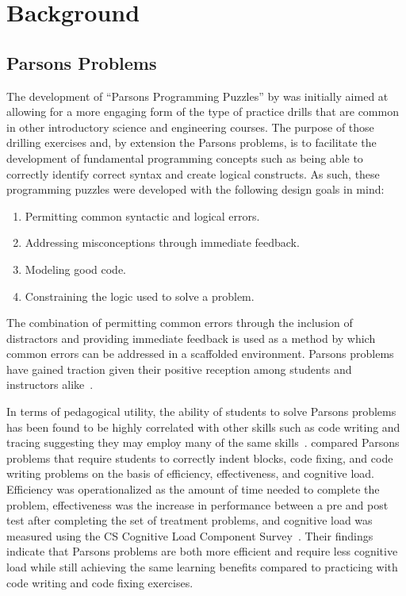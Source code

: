 \documentclass[authorversion,nonacm]{acmart}
\begin{document}
\section{Background}

\subsection{Parsons Problems}

The development of ``Parsons Programming Puzzles'' by \citet{parsons2006parson}
was initially aimed at allowing for a more engaging form of the type of
practice drills that are common in other introductory science and engineering
courses. The purpose of those drilling exercises and, by extension the Parsons
problems, is to facilitate the development of fundamental programming concepts
such as being able to correctly identify correct syntax and create logical
constructs.  As such, these programming puzzles were developed with the
following design goals in mind:
\begin{enumerate}
    \item Permitting common syntactic and logical errors.
    \item Addressing misconceptions through immediate feedback.
    \item Modeling good code.
    \item Constraining the logic used to solve a problem.
\end{enumerate}
The combination of permitting common errors through the inclusion of
distractors and providing immediate feedback is used as a method by which
common errors can be addressed in a scaffolded environment.  Parsons problems
have gained traction given their positive reception among students and
instructors alike~\cite{ericson2015analysis, ericson2016identifying}.

In terms of pedagogical utility, the ability of students to solve Parsons
problems has been found to be highly correlated with other skills such as code
writing and tracing suggesting they may employ many of the same
skills~\cite{whalley2007many, lopez2008relationships, venables2009closer,
fowler2022reevaluating}.  \citet{ericson2017solving} compared Parsons problems
that require students to correctly indent blocks, code fixing, and code writing
problems on the basis of efficiency, effectiveness, and cognitive load.
Efficiency was operationalized as the amount of time needed to complete the
problem, effectiveness was the increase in performance between a pre and post
test after completing the set of treatment problems, and cognitive load was
measured using the CS Cognitive Load Component
Survey~\cite{morrison2014measuring}. Their findings indicate that Parsons
problems are both more efficient and require less cognitive load while still
achieving the same learning benefits compared to practicing with code writing
and code fixing exercises.
\end{document}
